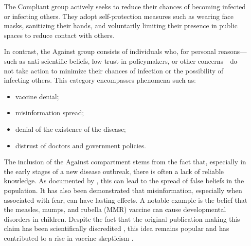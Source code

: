 The Compliant group actively seeks to reduce their chances of becoming infected or infecting others. They adopt self-protection measures such as wearing face masks, sanitizing their hands, and voluntarily limiting their presence in public spaces to reduce contact with others.

In contrast, the Against group consists of individuals who, for personal reasons—such as anti-scientific beliefs, low trust in policymakers, or other concerns—do not take action to minimize their chances of infection or the possibility of infecting others. This category encompasses phenomena such as: 
\begin{itemize} 
	\item vaccine denial; 
	\item misinformation spread; 
	\item denial of the existence of the disease; 
	\item distrust of doctors and government policies. 
\end{itemize}

The inclusion of the Against compartment stems from the fact that, especially in the early stages of a new disease outbreak, there is often a lack of reliable knowledge. As documented by \cite{McCormack_2020}, this can lead to the spread of false beliefs in the population. It has also been demonstrated \cite{owid-vaccine-skepticism} that misinformation, especially when associated with fear, can have lasting effects. A notable example is the belief that the measles, mumps, and rubella (MMR) vaccine can cause developmental disorders in children. Despite the fact that the original publication making this claim has been scientifically discredited \cite{wakefield1998retracted}, this idea remains popular and has contributed to a rise in vaccine skepticism \cite{owid-vaccine-skepticism}.

